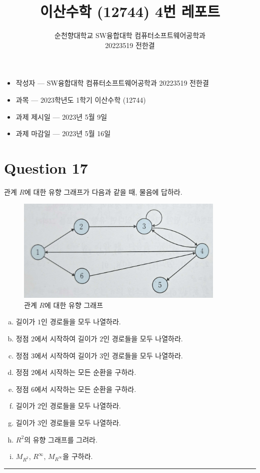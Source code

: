 \documentclass{oblivoir}
\title{이산수학 (12744) 4번 레포트}
\author{순천향대학교 SW융합대학 컴퓨터소프트웨어공학과\\20223519 전한결}
\newenvironment{question}{ }{ \par\noindent\rule{\textwidth}{0.4pt} }
\begin{document}
\maketitle

\begin{itemize}
    \item 작성자 --- SW융합대학 컴퓨터소프트웨어공학과 20223519 전한결
    \item 과목 --- 2023학년도 1학기 이산수학 (12744)
    \item 과제 제시일 --- 2023년 5월 9일
    \item 과제 마감일 --- 2023년 5월 16일
\end{itemize}

\pagebreak

\tableofcontents

\pagebreak

\section{Question 17}
\begin{question}
    관계 $R$에 대한 유향 그래프가 다음과 같을 때,
    물음에 답하라.

    \begin{figure}[h]
        \centering
        \includegraphics[width=10cm]{17}
        \caption{관계 $R$에 대한 유향 그래프}
        \label{fig:test_uno}
    \end{figure}

    \begin{enumerate}[(a)]
        \item 길이가 $1$인 경로들을 모두 나열하라.
        \item 정점 $2$에서 시작하여 길이가 $2$인 경로들을 모두 나열하라.
        \item 정점 $3$에서 시작하여 길이가 $3$인 경로들을 모두 나열하라.
        \item 정점 $2$에서 시작하는 모든 순환을 구하라.
        \item 정점 $6$에서 시작하는 모든 순환을 구하라.
        \item 길이가 $2$인 경로들을 모두 나열하라.
        \item 길이가 $3$인 경로들을 모두 나열하라.
        \item $R^2$의 유향 그래프를 그려라.
        \item $M_{R^2}$, $R^\infty$, $M_{R^\infty}$을 구하라.
    \end{enumerate}
\end{question}
\end{document}
